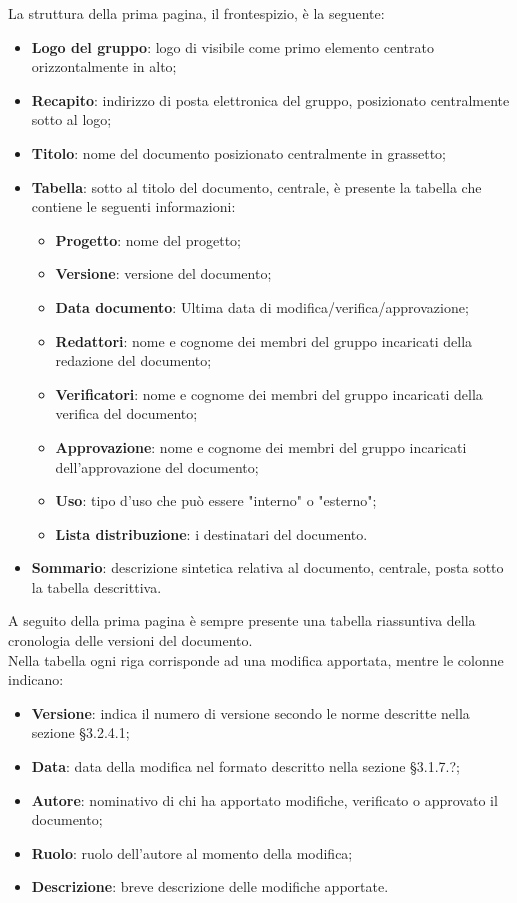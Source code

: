 		La struttura della prima pagina, il frontespizio, è la seguente:
		\begin{itemize}
			\item \textbf{Logo del gruppo}: logo di \Omicron visibile come primo elemento centrato orizzontalmente in alto;
			\item \textbf{Recapito}: indirizzo di posta elettronica del gruppo, posizionato centralmente sotto al logo;
			\item \textbf{Titolo}: nome del documento posizionato centralmente in grassetto;
			\item \textbf{Tabella}: sotto al titolo del documento, centrale, è presente la tabella che contiene le seguenti informazioni:
			\begin{itemize}
				\item \textbf{Progetto}: nome del progetto;
				\item \textbf{Versione}: versione del documento;
				\item \textbf{Data documento}: Ultima data di modifica/verifica/approvazione;
				\item \textbf{Redattori}: nome e cognome dei membri del gruppo incaricati della redazione del documento;
				\item \textbf{Verificatori}: nome e cognome dei membri del gruppo incaricati della verifica del documento;
				\item \textbf{Approvazione}: nome e cognome dei membri del gruppo incaricati dell'approvazione del documento;
				\item \textbf{Uso}: tipo d'uso che può essere "interno" o "esterno";
				\item \textbf{Lista distribuzione}: i destinatari del documento.
			\end{itemize}
			\item \textbf{Sommario}: descrizione sintetica relativa al documento, centrale, posta sotto la tabella descrittiva.
		\end{itemize}
		
	A seguito della prima pagina è sempre presente una tabella riassuntiva della cronologia delle versioni del documento. \\
	Nella tabella ogni riga corrisponde ad una modifica apportata, mentre le colonne indicano:
	\begin{itemize}
		\item \textbf{Versione}: indica il numero di versione secondo le norme descritte nella sezione §3.2.4.1;
		\item \textbf{Data}: data della modifica nel formato descritto nella sezione §3.1.7.?;
		\item \textbf{Autore}: nominativo di chi ha apportato modifiche, verificato o approvato il documento;
		\item \textbf{Ruolo}: ruolo dell'autore al momento della modifica;
		\item \textbf{Descrizione}: breve descrizione delle modifiche apportate.
	\end{itemize}
	
